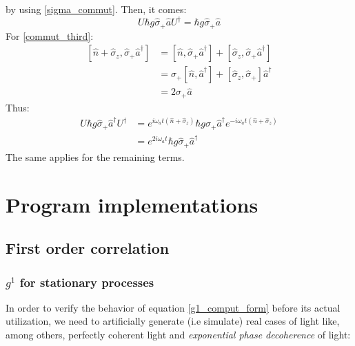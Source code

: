 \documentclass[12pt]{report}
\begin{document}
by using \eqref{sigma_commut}.
Then, it comes:
\begin{equation}
U\hbar g\hat{\sigma}_+\hat{a}U^\dag = \hbar g\hat{\sigma}_+\hat{a}
\end{equation}
For \eqref{commut_third}:
\begin{align}
\left[ \hat{n} + \hat{\sigma}_z, \hat{\sigma}_+ \hat{a}^\dag \right] &= \left[ \hat{n}, \hat{\sigma}_+ \hat{a}^\dag \right] + \left[ \hat{\sigma}_z, \hat{\sigma}_+ \hat{a}^\dag \right]\\
&= \hat{\sigma}_+ \left[ \hat{n}, \hat{a}^\dag \right] + \left[ \hat{\sigma}_z, \hat{\sigma}_+ \right] \hat{a}^\dag\\
&= 2\hat{\sigma}_+\hat{a}
\end{align}
Thus:
\begin{align}
U\hbar g\hat{\sigma}_+\hat{a}^\dag U^\dag &= e^{i\omega_a t(\hat{n} + \hat{\sigma}_z)}\hbar g\hat{\sigma}_+\hat{a}^\dag e^{-i\omega_a t(\hat{n} + \hat{\sigma}_z)}\\
&= e^{2i\omega_a t}\hbar g\hat{\sigma}_+\hat{a}^\dag
\end{align}
The same applies for the remaining terms.

\chapter{Program implementations}
\section{First order correlation}

\subsection{$g^1$ for stationary processes}

In order to verify the behavior of equation \eqref{g1_comput_form} before its actual utilization, we need to artificially generate (i.e simulate) real cases of light like, among others, perfectly coherent light and \textit{exponential phase decoherence} of light:
\end{document}
